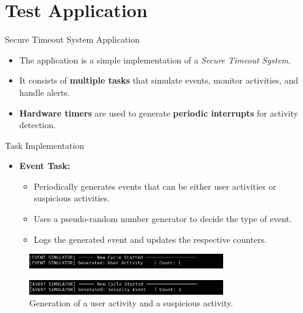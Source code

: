 
\section{Test Application}

\begin{frame}{Secure Timeout System Application}
    \begin{itemize}
        \item The application is a simple implementation of a \textit{Secure Timeout System}.
        \item It consists of \textbf{multiple tasks} that simulate events, monitor activities, and handle alerts.
        \item \textbf{Hardware timers} are used to generate \textbf{periodic interrupts} for activity detection.
    \end{itemize}
\end{frame}

\begin{frame}{Task Implementation}
    \begin{itemize}
        \item \textbf{Event Task:}
            \begin{itemize}
                \item Periodically generates events that can be either user activities or suspicious activities.
                \item Uses a pseudo-random number generator to decide the type of event.
                \item Logs the generated event and updates the respective counters.
            \end{itemize}
    \end{itemize}
    \begin{figure}[h]
        \centering
        \includegraphics[width=0.75\textwidth]{images/event_task_1.png}
    \end{figure}
    \begin{figure}[h]
        \centering
        \includegraphics[width=0.75\textwidth]{images/event_task_2.png}
        \caption{Generation of a user activity and a suspicious activity.}
    \end{figure}
\end{frame}

